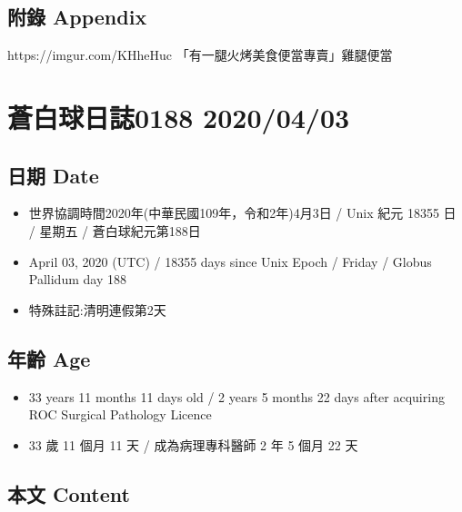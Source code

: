 \documentclass[
]{article}
\providecommand{\tightlist}{%
  \setlength{\itemsep}{0pt}\setlength{\parskip}{0pt}}
\begin{document}
\hypertarget{ux9644ux9304-appendix-1}{%
\subsection{附錄 Appendix}\label{ux9644ux9304-appendix-1}}

https://imgur.com/KHheHuc 「有一腿火烤美食便當專賣」雞腿便當

\hypertarget{ux84bcux767dux7403ux65e5ux8a8c0188-20200403}{%
\section{蒼白球日誌0188
2020/04/03}\label{ux84bcux767dux7403ux65e5ux8a8c0188-20200403}}

\hypertarget{ux65e5ux671f-date-2}{%
\subsection{日期 Date}\label{ux65e5ux671f-date-2}}

\begin{itemize}
\tightlist
\item
  世界協調時間2020年(中華民國109年，令和2年)4月3日 / Unix 紀元 18355 日
  / 星期五 / 蒼白球紀元第188日
\item
  April 03, 2020 (UTC) / 18355 days since Unix Epoch / Friday / Globus
  Pallidum day 188
\item
  特殊註記:清明連假第2天
\end{itemize}

\hypertarget{ux5e74ux9f61-age-2}{%
\subsection{年齡 Age}\label{ux5e74ux9f61-age-2}}

\begin{itemize}
\tightlist
\item
  33 years 11 months 11 days old / 2 years 5 months 22 days after
  acquiring ROC Surgical Pathology Licence
\item
  33 歲 11 個月 11 天 / 成為病理專科醫師 2 年 5 個月 22 天
\end{itemize}

\hypertarget{ux672cux6587-content-2}{%
\subsection{本文 Content}\label{ux672cux6587-content-2}}
\end{document}
